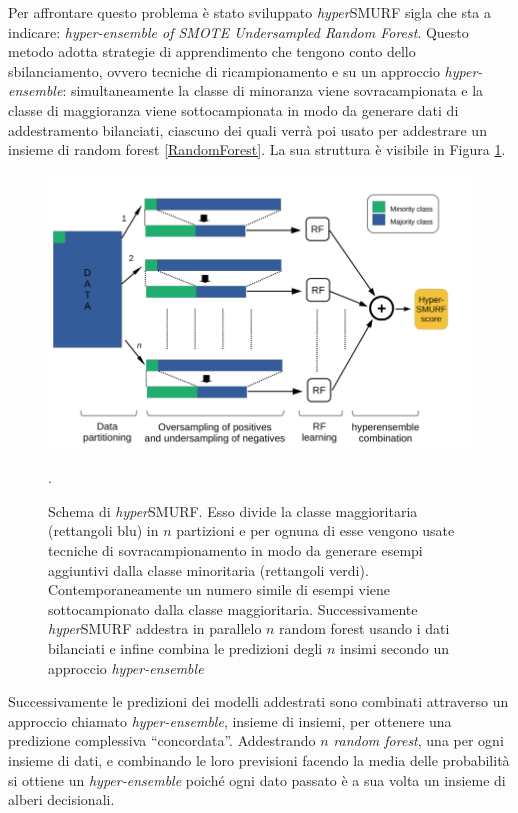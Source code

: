\documentclass[12pt,italian]{report}
\begin{document}
	Per affrontare questo problema è stato sviluppato \textit{hyper}SMURF \cite{Schubach2017} sigla che sta a indicare: \textit{hyper-ensemble of SMOTE Undersampled Random Forest}. Questo metodo adotta strategie di apprendimento che tengono conto dello sbilanciamento, ovvero tecniche di ricampionamento e su un approccio \textit{hyper-ensemble}: simultaneamente la classe di minoranza viene sovracampionata e la classe di maggioranza viene sottocampionata in modo da generare dati di addestramento bilanciati, ciascuno dei quali verrà poi usato per addestrare un insieme di random forest \ref{RandomForest}. La sua struttura è visibile in Figura \ref{fig:hypersmurf}.
	\begin{figure}[h!]
		\centering
		\includegraphics[width=0.7\linewidth]{immagini/hyperSMURF}
		\caption{Schema di \textit{hyper}SMURF. Esso divide la classe maggioritaria (rettangoli blu) in $n$ partizioni e per ognuna di esse vengono usate tecniche di sovracampionamento in modo da generare esempi aggiuntivi dalla classe minoritaria (rettangoli verdi). Contemporaneamente un numero simile di esempi viene sottocampionato dalla classe maggioritaria. Successivamente \textit{hyper}SMURF addestra in parallelo $n$ random forest usando i dati bilanciati e infine combina le predizioni degli $n$ insimi secondo un approccio \textit{hyper-ensemble}}.
		\label{fig:hypersmurf}
	\end{figure}

	Successivamente le predizioni dei modelli addestrati sono combinati attraverso un approccio chiamato \textit{hyper-ensemble}, insieme di insiemi, per ottenere una predizione complessiva ``concordata''. Addestrando $n$ \textit{random forest}, una per ogni insieme di dati, e combinando le loro previsioni facendo la media delle probabilità si ottiene un \textit{hyper-ensemble} poiché ogni dato passato è a sua volta un insieme di alberi decisionali.
	
\end{document}
